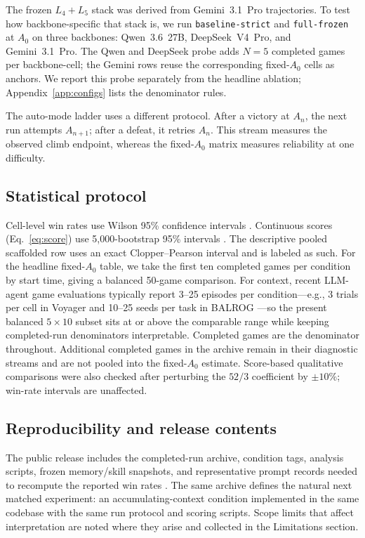 The frozen $L_4{+}L_5$ stack was derived from Gemini~3.1~Pro
trajectories. To test how backbone-specific that stack is, we run
\texttt{baseline-strict} and \texttt{full-frozen} at $A_0$ on three
backbones: Qwen~3.6~27B, DeepSeek~V4~Pro, and Gemini~3.1~Pro. The
Qwen and DeepSeek probe adds $N{=}5$ completed games per
backbone-cell; the Gemini rows reuse the corresponding fixed-$A_0$
cells as anchors. We report this probe separately from the headline
ablation; Appendix~\ref{app:configs} lists the denominator rules.

The auto-mode ladder uses a different protocol. After a victory at
$A_n$, the next run attempts $A_{n+1}$; after a defeat, it retries
$A_n$. This stream measures the observed climb endpoint, whereas the
fixed-$A_0$ matrix measures reliability at one difficulty.

\subsection{Statistical protocol}
\label{sec:methodology:stats}

Cell-level win rates use Wilson 95\% confidence intervals
\citep{wilson1927}. Continuous scores (Eq.~\ref{eq:score}) use
5{,}000-bootstrap 95\% intervals \citep{efron1979}. The descriptive pooled scaffolded row uses an exact
Clopper--Pearson interval and is labeled as such. For the headline
fixed-$A_0$ table, we take the first ten completed games per
condition by start time, giving a balanced 50-game comparison. For
context, recent LLM-agent game evaluations typically report
3--25 episodes per condition---e.g., $3$ trials per cell in Voyager
\citep{voyager2023} and 10--25 seeds per task in BALROG
\citep{balrog2024}---so the present balanced $5\!\times\!10$ subset
sits at or above the comparable range while keeping completed-run
denominators interpretable. Completed games are the denominator
throughout. Additional completed games in the archive remain in
their diagnostic streams and are not pooled into the fixed-$A_0$
estimate. Score-based qualitative comparisons were also checked
after perturbing the $52/3$ coefficient by $\pm 10\%$; win-rate
intervals are unaffected.

\subsection{Reproducibility and release contents}
\label{sec:methodology:repro}

The public release includes the completed-run archive, condition
tags, analysis scripts, frozen memory/skill snapshots, and
representative prompt records needed to recompute the reported win
rates \citep{deal-checklist-2025,liu-versioning-2025}. The same
archive defines the natural next matched experiment: an
accumulating-context condition implemented in the same codebase with
the same run protocol and scoring scripts. Scope limits that affect
interpretation are noted where they arise and collected in the
Limitations section.
